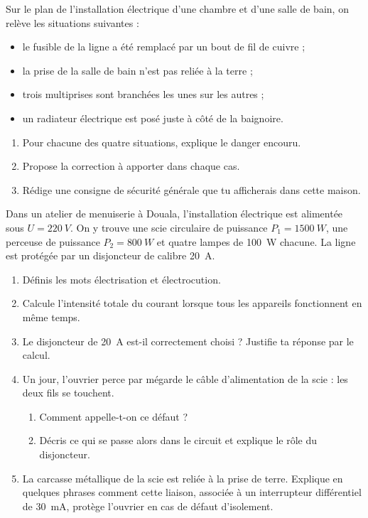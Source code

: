 \documentclass[11pt]{article}
\newcommand{\cle}[1]{{\popxbold\color{popdark}#1}}
\newcounter{popsec}
\newcounter{popsub}
\newcommand{\courssub}[1]{%
  \stepcounter{popsub}%
  \par\vspace{9pt}\noindent{\popxbold\fontsize{11.5}{13}\selectfont\color{popink}{\color{poporange}\thepopsec.\thepopsub}\hspace{6pt}#1}\par\nopagebreak\vspace{4pt}
}
\begin{document}
\begin{exercice}
Sur le plan de l'installation électrique d'une chambre et d'une salle de bain, on relève les situations suivantes :
\begin{itemize}
\item le fusible de la ligne a été remplacé par un bout de fil de cuivre ;
\item la prise de la salle de bain n'est pas reliée à la terre ;
\item trois multiprises sont branchées les unes sur les autres ;
\item un radiateur électrique est posé juste à côté de la baignoire.
\end{itemize}
\begin{enumerate}
\item Pour chacune des quatre situations, explique le danger encouru.
\item Propose la correction à apporter dans chaque cas.
\item Rédige une consigne de sécurité générale que tu afficherais dans cette maison.
\end{enumerate}
\end{exercice}

\courssub{Je me prépare au Bac}

\begin{exercice}
Dans un atelier de menuiserie à Douala, l'installation électrique est alimentée sous $U = \SI{220}{V}$. On y trouve une scie circulaire de puissance $P_1 = \SI{1500}{W}$, une perceuse de puissance $P_2 = \SI{800}{W}$ et quatre lampes de \SI{100}{W} chacune. La ligne est protégée par un disjoncteur de calibre \SI{20}{A}.
\begin{enumerate}
\item Définis les mots \cle{électrisation} et \cle{électrocution}.
\item Calcule l'intensité totale du courant lorsque tous les appareils fonctionnent en même temps.
\item Le disjoncteur de \SI{20}{A} est-il correctement choisi ? Justifie ta réponse par le calcul.
\item Un jour, l'ouvrier perce par mégarde le câble d'alimentation de la scie : les deux fils se touchent.
\begin{enumerate}
\item Comment appelle-t-on ce défaut ?
\item Décris ce qui se passe alors dans le circuit et explique le rôle du disjoncteur.
\end{enumerate}
\item La carcasse métallique de la scie est reliée à la prise de terre. Explique en quelques phrases comment cette liaison, associée à un interrupteur différentiel de \SI{30}{mA}, protège l'ouvrier en cas de défaut d'isolement.
\end{enumerate}
\end{exercice}
\end{document}
